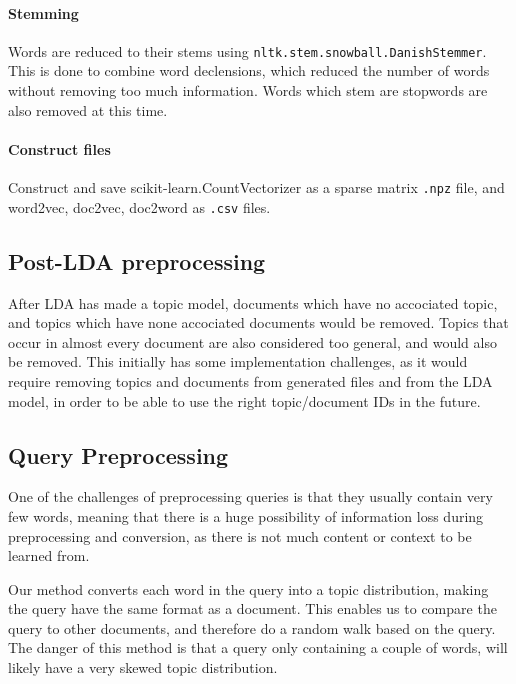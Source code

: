 \paragraph{Stemming}
Words are reduced to their stems using \texttt{nltk.stem.snowball.DanishStemmer}. 
This is done to combine word declensions, which reduced the number of words without removing too much information.
Words which stem are stopwords are also removed at this time.

\paragraph{Construct files}
Construct and save scikit-learn.CountVectorizer as a sparse matrix \texttt{.npz} file, and word2vec, doc2vec, doc2word as \texttt{.csv} files.


\subsection{Post-LDA preprocessing}
After LDA has made a topic model, documents which have no accociated topic, and topics which have none accociated documents would be removed.
Topics that occur in almost every document are also considered too general, and would also be removed.
This initially has some implementation challenges, as it would require removing topics and documents from generated files and from the LDA model, in order to be able to use the right topic/document IDs in the future.

\subsection{Query Preprocessing}
One of the challenges of preprocessing queries is that they usually contain very few words, meaning that there is a huge possibility of information loss during preprocessing and conversion, as there is not much content or context to be learned from.

Our method converts each word in the query into a topic distribution, making the query have the same format as a document. 
This enables us to compare the query to other documents, and therefore do a random walk based on the query.
The danger of this method is that a query only containing a couple of words, will likely have a very skewed topic distribution.